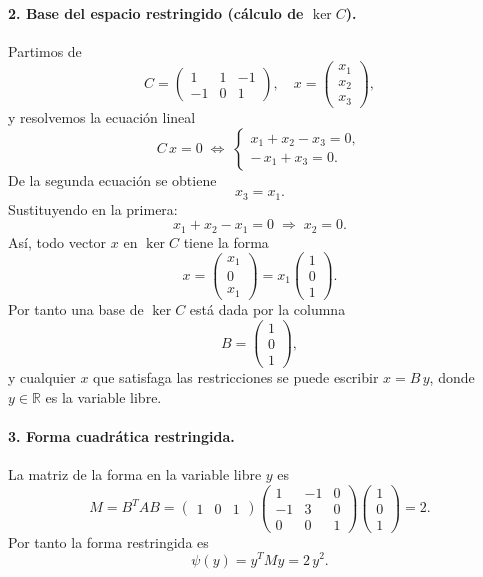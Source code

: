 \documentclass{article}
\begin{document}
\paragraph*{2. Base del espacio restringido (cálculo de \(\ker C\)).}

Partimos de
\[
C = \begin{pmatrix}
1 & 1 & -1\\[4pt]
-1 & 0 & 1
\end{pmatrix},
\quad
x = \begin{pmatrix}x_1\\x_2\\x_3\end{pmatrix},
\]
y resolvemos la ecuación lineal
\[
C\,x = 0
\;\Longleftrightarrow\;
\begin{cases}
x_1 + x_2 - x_3 = 0,\\[4pt]
-\,x_1 + x_3 = 0.
\end{cases}
\]
De la segunda ecuación se obtiene
\[
x_3 = x_1.
\]
Sustituyendo en la primera:
\[
x_1 + x_2 - x_1 = 0
\;\Longrightarrow\;
x_2 = 0.
\]
Así, todo vector \(x\) en \(\ker C\) tiene la forma
\[
x = \begin{pmatrix}x_1\\0\\x_1\end{pmatrix}
= x_1 \begin{pmatrix}1\\0\\1\end{pmatrix}.
\]
Por tanto una base de \(\ker C\) está dada por la columna
\[
B = \begin{pmatrix}1\\0\\1\end{pmatrix},
\]
y cualquier \(x\) que satisfaga las restricciones se puede escribir \(x = B\,y\), donde \(y\in\mathbb{R}\) es la variable libre.









\paragraph*{3. Forma cuadrática restringida.}  
La matriz de la forma en la variable libre \(y\) es
\[
M = B^T A B
= \begin{pmatrix}1 & 0 & 1\end{pmatrix}
  \begin{pmatrix}
    1 & -1 & 0\\
   -1 &  3 & 0\\
    0 &  0 & 1
  \end{pmatrix}
  \begin{pmatrix}1\\0\\1\end{pmatrix}
= 2.
\]
Por tanto la forma restringida es
\[
\psi(y) = y^T M y = 2\,y^2.
\]
\end{document}
